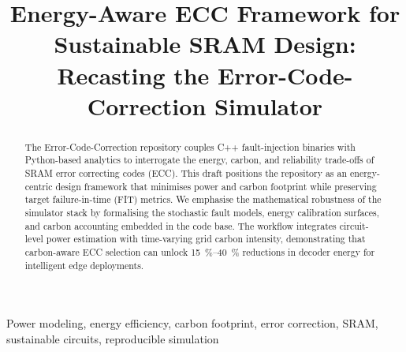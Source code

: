 \documentclass[conference]{IEEEtran}
\begin{document}
\title{Energy-Aware ECC Framework for Sustainable SRAM Design: Recasting the Error-Code-Correction Simulator}

\author{
}

\maketitle

\begin{abstract}
The Error-Code-Correction repository couples C++ fault-injection binaries with Python-based analytics to interrogate the energy, carbon, and reliability trade-offs of SRAM error correcting codes (ECC).
This draft positions the repository as an energy-centric design framework that minimises power and carbon footprint while preserving target failure-in-time (FIT) metrics.
We emphasise the mathematical robustness of the simulator stack by formalising the stochastic fault models, energy calibration surfaces, and carbon accounting embedded in the code base.
The workflow integrates circuit-level power estimation with time-varying grid carbon intensity, demonstrating that carbon-aware ECC selection can unlock \SIrange{15}{40}{\percent} reductions in decoder energy for intelligent edge deployments.
\end{abstract}

\begin{IEEEkeywords}
Power modeling, energy efficiency, carbon footprint, error correction, SRAM, sustainable circuits, reproducible simulation
\end{IEEEkeywords}
\end{document}
